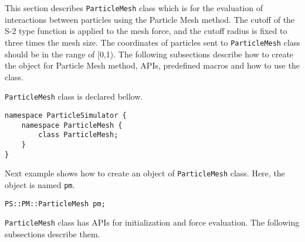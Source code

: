 
This section describes {\tt ParticleMesh} class which is for the
evaluation of interactions between particles using the Particle Mesh
method. The cutoff of the S-2 type function is applied to the mesh
force, and the cutoff radius is fixed to three times the mesh
size. The coordinates of particles sent to {\tt ParticleMesh} class
should be in the range of [0,1).
The following subsections describe how to create the object
for Particle Mesh method, APIs, predefined macros and how to use the
class.



{\tt ParticleMesh} class is declared bellow.

\begin{lstlisting}[caption=ParticleMesh0]
namespace ParticleSimulator {
    namespace ParticleMesh {
        class ParticleMesh;
    }
}
\end{lstlisting}


Next example shows how to create an object of {\tt ParticleMesh} class.
Here, the object is named {\tt pm}.

\begin{screen}
\begin{verbatim}
PS::PM::ParticleMesh pm;
\end{verbatim}
\end{screen}


{\tt ParticleMesh} class has APIs for initialization and force
evaluation. The following subsections describe them.


